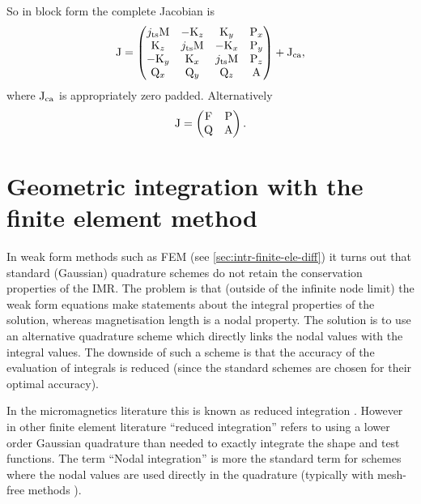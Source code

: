 So in block form the complete Jacobian is
\begin{equation}
  \mathrm{J} =
  \begin{pmatrix}
    j_\text{ts} \mathrm{M}    & -\mathrm{K}_z       & \mathrm{K}_y      & \mathrm{P}_x \\
    \mathrm{K}_z         & j_\text{ts}\mathrm{M}    & -\mathrm{K}_x     & \mathrm{P}_y \\
    -\mathrm{K}_y        & \mathrm{K}_x      & j_\text{ts} \mathrm{M} & \mathrm{P}_z \\
    \mathrm{Q}_x       & \mathrm{Q}_y      & \mathrm{Q}_z    & \mathrm{A}     \\
  \end{pmatrix} + \mathrm{J}_\text{ca},
\end{equation}
where $\mathrm{J}_\text{ca}$ is appropriately zero padded.
Alternatively
\begin{equation}
\mathrm{J} =
  \begin{pmatrix}
    \mathrm{F}   & \mathrm{P} \\
    \mathrm{Q}   & \mathrm{A} \\
  \end{pmatrix}.
\end{equation}



\section{Geometric integration with the finite element method}
\label{sec:nodal-integration}


In weak form methods such as FEM (see \cref{sec:intr-finite-ele-diff}) it turns out that standard (\ie Gaussian) quadrature schemes do not retain the conservation properties of the IMR.
The problem is that (outside of the infinite node limit) the weak form equations make statements about the integral properties of the solution, whereas magnetisation length is a nodal property.
The solution is to use an alternative quadrature scheme which directly links the nodal values with the integral values.
The downside of such a scheme is that the accuracy of the evaluation of integrals is reduced (since the standard schemes are chosen for their optimal accuracy).

In the micromagnetics literature this is known as reduced integration \cite{Cimrak2008}.
However in other finite element literature ``reduced integration'' refers to using a lower order Gaussian quadrature than needed to exactly integrate the shape and test functions.
The term ``Nodal integration'' is more the standard term for schemes where the nodal values are used directly in the quadrature (typically with mesh-free methods \eg \cite{Puso2008}).

